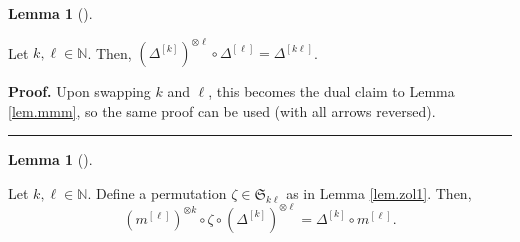\documentclass[numbers=enddot,12pt,final,onecolumn,notitlepage]{scrartcl}%
\theoremstyle{definition}
\newtheorem{lem}[theo]{Lemma}
\newenvironment{lemma}[1][]
{\begin{lem}[#1]\begin{leftbar}}
{\end{leftbar}\end{lem}}
\newenvironment{proof}[1][Proof]{\noindent\textbf{#1.} }{\ \rule{0.5em}{0.5em}}
\begin{document}
\begin{lemma}
\label{lem.DDD}Let $k,\ell\in\mathbb{N}$. Then, $\left(  \Delta^{\left[
k\right]  }\right)  ^{\otimes\ell}\circ\Delta^{\left[  \ell\right]  }%
=\Delta^{\left[  k\ell\right]  }$.
\end{lemma}

\begin{proof}
Upon swapping $k$ and $\ell$, this becomes the dual claim to Lemma
\ref{lem.mmm}, so the same proof can be used (with all arrows reversed).
\end{proof}

\begin{lemma}
\label{lem.mDc}Let $k,\ell\in\mathbb{N}$. Define a permutation $\zeta
\in\mathfrak{S}_{k\ell}$ as in Lemma \ref{lem.zol1}. Then,
\[
\left(  m^{\left[  \ell\right]  }\right)  ^{\otimes k}\circ\zeta\circ\left(
\Delta^{\left[  k\right]  }\right)  ^{\otimes\ell}=\Delta^{\left[  k\right]
}\circ m^{\left[  \ell\right]  }.
\]

\end{lemma}
\end{document}
